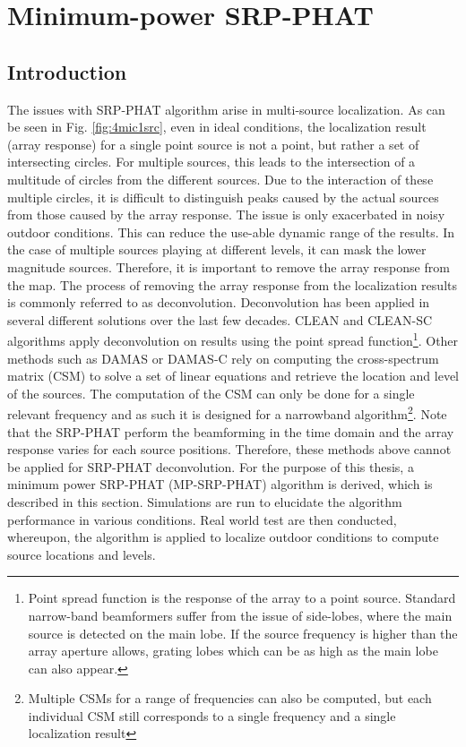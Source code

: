 \chapter{Minimum-power SRP-PHAT}
\section{Introduction}
The issues with SRP-PHAT algorithm arise in multi-source localization. As can be seen in Fig. \ref{fig:4mic1src}, even in ideal conditions, the localization result (array response) for a single point source is not a point, but rather a set of intersecting circles. For multiple sources, this leads to the intersection of a multitude of circles from the different sources. Due to the interaction of these multiple circles, it is difficult to distinguish peaks caused by the actual sources from those caused by the array response. The issue is only exacerbated in noisy outdoor conditions. This can reduce the use-able dynamic range of the results. In the case of multiple sources playing at different levels, it can mask the lower magnitude sources. Therefore, it is important to remove the array response from the map. The process of removing the array response from the localization results is commonly referred to as deconvolution. Deconvolution has been applied in several different solutions over the last few decades. CLEAN \cite{hogbom1974aperture} and CLEAN-SC \cite{sijtsma2007clean} algorithms apply deconvolution on results using the point spread function\footnote{Point spread function is the response of the array to a point source. Standard narrow-band beamformers suffer from the issue of side-lobes, where the main source is detected on the main lobe. If the source frequency is higher than the array aperture allows, grating lobes which can be as high as the main lobe can also appear.}. Other methods such as DAMAS \cite{brooks2006deconvolution} or DAMAS-C \cite{brooks2006extension} rely on computing the cross-spectrum matrix (CSM) to solve a set of linear equations and retrieve the location and level of the sources. The computation of the CSM can only be done for a single relevant frequency and as such it is designed for a narrowband algorithm\footnote{Multiple CSMs for a range of frequencies can also be computed, but each individual CSM still corresponds to a single frequency and a single localization result}. Note that the SRP-PHAT perform the beamforming in the time domain and the array response varies for each source positions. Therefore, these methods above cannot be applied for SRP-PHAT deconvolution. For the purpose of this thesis, a minimum power SRP-PHAT (MP-SRP-PHAT) algorithm is derived, which is described in this section. Simulations are run to elucidate the algorithm performance in various conditions. Real world test are then conducted, whereupon, the algorithm is applied to localize outdoor conditions to compute source locations and levels.

